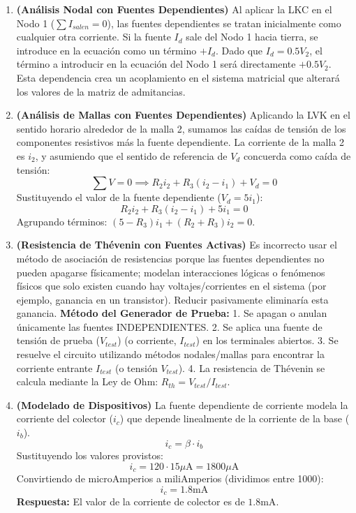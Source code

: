 \documentclass[12pt, a4paper]{article}
\begin{document}
\begin{enumerate}[leftmargin=*, itemsep=2em]
    \item \textbf{(Análisis Nodal con Fuentes Dependientes)}
    Al aplicar la LKC en el Nodo 1 ($\sum I_{salen} = 0$), las fuentes dependientes se tratan inicialmente como cualquier otra corriente. Si la fuente $I_d$ sale del Nodo 1 hacia tierra, se introduce en la ecuación como un término $+I_d$. 
    Dado que $I_d = 0.5 V_2$, el término a introducir en la ecuación del Nodo 1 será directamente $+0.5 V_2$. Esta dependencia crea un acoplamiento en el sistema matricial que alterará los valores de la matriz de admitancias.

    \item \textbf{(Análisis de Mallas con Fuentes Dependientes)}
    Aplicando la LVK en el sentido horario alrededor de la malla 2, sumamos las caídas de tensión de los componentes resistivos más la fuente dependiente.
    La corriente de la malla 2 es $i_2$, y asumiendo que el sentido de referencia de $V_d$ concuerda como caída de tensión:
    $$\sum V = 0 \implies R_2 i_2 + R_3 (i_2 - i_1) + V_d = 0$$
    Sustituyendo el valor de la fuente dependiente ($V_d = 5 i_1$):
    $$R_2 i_2 + R_3 (i_2 - i_1) + 5 i_1 = 0$$
    Agrupando términos: $(5 - R_3) i_1 + (R_2 + R_3) i_2 = 0$.

    \item \textbf{(Resistencia de Thévenin con Fuentes Activas)}
    Es incorrecto usar el método de asociación de resistencias porque las fuentes dependientes no pueden apagarse físicamente; modelan interacciones lógicas o fenómenos físicos que solo existen cuando hay voltajes/corrientes en el sistema (por ejemplo, ganancia en un transistor). Reducir pasivamente eliminaría esta ganancia.
    \newline
    \textbf{Método del Generador de Prueba:} 
    1. Se apagan o anulan únicamente las fuentes INDEPENDIENTES. 
    2. Se aplica una fuente de tensión de prueba ($V_{test}$) (o corriente, $I_{test}$) en los terminales abiertos.
    3. Se resuelve el circuito utilizando métodos nodales/mallas para encontrar la corriente entrante $I_{test}$ (o tensión $V_{test}$).
    4. La resistencia de Thévenin se calcula mediante la Ley de Ohm: $R_{th} = V_{test} / I_{test}$.

    \item \textbf{(Modelado de Dispositivos)}
    La fuente dependiente de corriente modela la corriente del colector ($i_c$) que depende linealmente de la corriente de la base ($i_b$).
    $$i_c = \beta \cdot i_b$$
    Sustituyendo los valores provistos:
    $$i_c = 120 \cdot 15\mu\text{A} = 1800\mu\text{A}$$
    Convirtiendo de microAmperios a miliAmperios (dividimos entre 1000):
    $$i_c = 1.8\text{mA}$$
    \textbf{Respuesta:} El valor de la corriente de colector es de $1.8\text{mA}$.


\end{enumerate}
\end{document}
